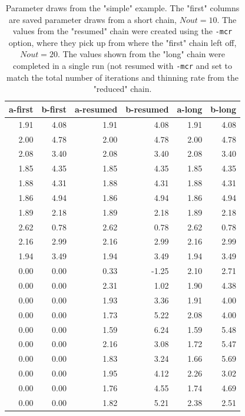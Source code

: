 \documentclass{article}\usepackage[]{graphicx}\usepackage[]{color}
\begin{document}
\begin{table}[ht]
\centering
\begin{tabular}{rrrrrr}
  \hline
  a-first & b-first & a-resumed & b-resumed & a-long & b-long \\ 
  \hline
  1.91 & 4.08 & 1.91 & 4.08 & 1.91 & 4.08 \\ 
  2.00 & 4.78 & 2.00 & 4.78 & 2.00 & 4.78 \\ 
  2.08 & 3.40 & 2.08 & 3.40 & 2.08 & 3.40 \\ 
  1.85 & 4.35 & 1.85 & 4.35 & 1.85 & 4.35 \\ 
  1.88 & 4.31 & 1.88 & 4.31 & 1.88 & 4.31 \\ 
  1.86 & 4.94 & 1.86 & 4.94 & 1.86 & 4.94 \\ 
  1.89 & 2.18 & 1.89 & 2.18 & 1.89 & 2.18 \\ 
  2.62 & 0.78 & 2.62 & 0.78 & 2.62 & 0.78 \\ 
  2.16 & 2.99 & 2.16 & 2.99 & 2.16 & 2.99 \\ 
  1.94 & 3.49 & 1.94 & 3.49 & 1.94 & 3.49 \\ 
  0.00 & 0.00 & 0.33 & -1.25 & 2.10 & 2.71 \\ 
  0.00 & 0.00 & 2.31 & 1.02 & 1.90 & 4.38 \\ 
  0.00 & 0.00 & 1.93 & 3.36 & 1.91 & 4.00 \\ 
  0.00 & 0.00 & 1.73 & 5.22 & 2.08 & 4.00 \\ 
  0.00 & 0.00 & 1.59 & 6.24 & 1.59 & 5.48 \\ 
  0.00 & 0.00 & 2.16 & 3.08 & 1.72 & 5.47 \\ 
  0.00 & 0.00 & 1.83 & 3.24 & 1.66 & 5.69 \\ 
  0.00 & 0.00 & 1.95 & 4.12 & 2.26 & 3.02 \\ 
  0.00 & 0.00 & 1.76 & 4.55 & 1.74 & 4.69 \\ 
  0.00 & 0.00 & 1.82 & 5.21 & 2.38 & 2.51 \\ 
   \hline
\end{tabular}
\caption{Parameter draws from the "simple" example. The "first" columns are saved 
parameter draws from a short chain, $Nout=10$. The values from the "resumed" chain
were created using the \texttt{-mcr} option, where they pick up from where the 
"first" chain left off, $Nout=20$. The values shown from the "long" chain 
were completed in a single run (not resumed with \texttt{-mcr} and set to match 
the total number of iterations and thinning rate from the "reduced" chain.}
\label{tab:mcr_table}
\end{table}
\end{document}
